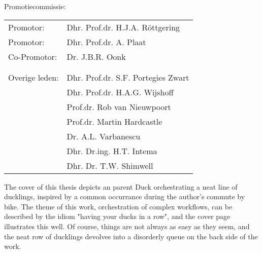 

Promotiecommissie:



\begin{tabular}{ll}
    Promotor: &Dhr. Prof.dr. H.J.A. R{\"o}ttgering \\

Promotor: &Dhr. Prof.dr. A. Plaat \\

Co-Promotor: &Dr. J.B.R. Oonk \\

\\

\\

Overige leden: &Dhr. Prof.dr. S.F. Portegies Zwart\\

    &Dhr. Prof.dr. H.A.G. Wijshoff \\
    
    &Prof.dr. Rob van Nieuwpoort \\
    
    &Prof.dr. Martin Hardcastle \\
    
    &Dr. A.L. Varbanescu\\

    &Dhr. Dr.ing. H.T. Intema\\
    
    & Dhr. Dr. T.W. Shimwell\\

\end{tabular}


\vskip 3.0in

The cover of this thesis depicts an parent Duck orchestrating a neat line of ducklings, inspired by a common occurrance during the author's commute by bike. The theme of this work, orchestration of complex workflows, can be described by the idiom "having your ducks in a row", and the cover page illustrates this well. Of course, things are not always as easy as they seem, and the neat row of ducklings devolves into a disorderly queue on the back side of the work.  
